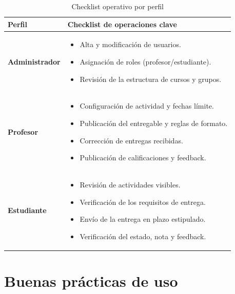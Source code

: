 \begin{table}[!htbp]
\centering
\begin{tabular}{|P{3.5cm}|P{8.5cm}|}
\hline
\textbf{Perfil} & \textbf{Checklist de operaciones clave} \\
\hline
\textbf{Administrador} & \vspace{-3mm}\begin{itemize} \item Alta y modificaci\'on de usuarios. \item Asignaci\'on de roles (profesor/estudiante). \item Revisi\'on de la estructura de cursos y grupos. \end{itemize}\vspace{-3mm} \\
\hline
\textbf{Profesor} & \vspace{-3mm}\begin{itemize} \item Configuraci\'on de actividad y fechas l\'imite. \item Publicaci\'on del entregable y reglas de formato. \item Correcci\'on de entregas recibidas. \item Publicaci\'on de calificaciones y feedback. \end{itemize}\vspace{-3mm} \\
\hline
\textbf{Estudiante} & \vspace{-3mm}\begin{itemize} \item Revisi\'on de actividades visibles. \item Verificaci\'on de los requisitos de entrega. \item Env\'io de la entrega en plazo estipulado. \item Verificaci\'on del estado, nota y feedback. \end{itemize}\vspace{-3mm} \\
\hline
\end{tabular}
\caption{Checklist operativo por perfil}
\label{tab:manual-checklist}
\end{table}

\FloatBarrier

\section{Buenas pr\'acticas de uso}

